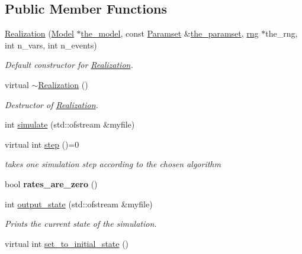\subsection*{Public Member Functions}
\begin{DoxyCompactItemize}
\item 
\hyperlink{class_realization_af4cfb6f2221bef9ba5ad09564796677f}{Realization} (\hyperlink{class_model}{Model} $\ast$\hyperlink{class_realization_a47ec1d062b8caee874b08c1a17d6aeeb}{the\+\_\+model}, const \hyperlink{class_paramset}{Paramset} \&\hyperlink{class_realization_a119bb29de88929bc51bc1b329473a94b}{the\+\_\+paramset}, \hyperlink{classrng}{rng} $\ast$the\+\_\+rng, int n\+\_\+vars, int n\+\_\+events)
\begin{DoxyCompactList}\small\item\em Default constructor for \hyperlink{class_realization}{Realization}. \end{DoxyCompactList}\item 
virtual \hyperlink{class_realization_a040c39b39c5057c668bd264b4329f2b4}{$\sim$\+Realization} ()
\begin{DoxyCompactList}\small\item\em Destructor of \hyperlink{class_realization}{Realization}. \end{DoxyCompactList}\item 
int \hyperlink{class_realization_a4e21bc7355e33c17d1401736b3c62413}{simulate} (std\+::ofstream \&myfile)
\item 
\mbox{\label{class_realization_a9949217117927b149850288f3b74c9ef}} 
virtual int \hyperlink{class_realization_a9949217117927b149850288f3b74c9ef}{step} ()=0
\begin{DoxyCompactList}\small\item\em takes one simulation step according to the chosen algorithm \end{DoxyCompactList}\item 
\mbox{\label{class_realization_a48953442ebf235cd1e02731c7419f65f}} 
bool {\bfseries rates\+\_\+are\+\_\+zero} ()
\item 
int \hyperlink{class_realization_ab7ef90279eef4bf11261084f541c7bb0}{output\+\_\+state} (std\+::ofstream \&myfile)
\begin{DoxyCompactList}\small\item\em Prints the current state of the simulation. \end{DoxyCompactList}\item 
virtual int \hyperlink{class_realization_a391a89af7574a9053f53f8a299c2cc70}{set\+\_\+to\+\_\+initial\+\_\+state} ()
\end{DoxyCompactItemize}
